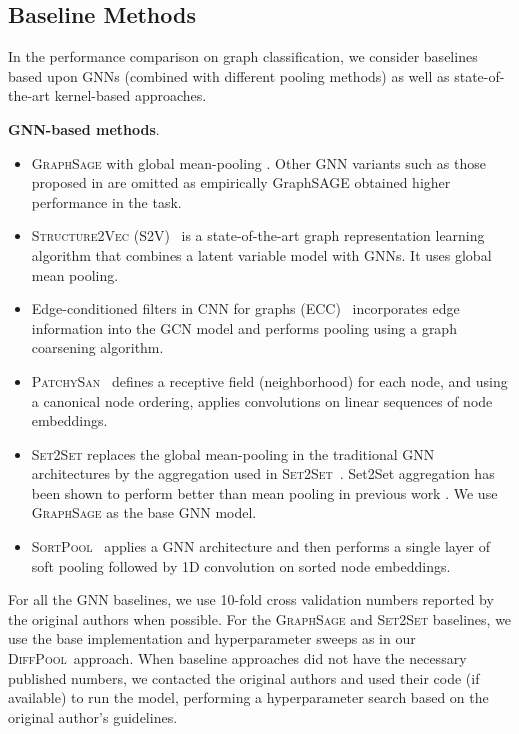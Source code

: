 \documentclass{article}
\newcommand{\xhdr}[1]{{\noindent\bfseries #1}.}
\newcommand{\name}{\textsc{DiffPool}\xspace}
\begin{document}
\subsection{Baseline Methods}
In the performance comparison on graph classification, we consider baselines based upon GNNs (combined with different pooling methods) as well as state-of-the-art kernel-based approaches. 

\xhdr{GNN-based methods} 
\begin{itemize}[leftmargin=15pt, topsep=-5pt, parsep=0pt]
    \item \textsc{GraphSage} with global mean-pooling \cite{hamilton2017inductive}. Other GNN variants such as those proposed in \cite{kipf2017semi} are omitted as empirically GraphSAGE obtained higher performance in the task.
    \item \textsc{Structure2Vec} (\textsc{S2V})~\cite{dai2016discriminative} is a state-of-the-art graph representation learning algorithm that combines a latent variable model with GNNs. It uses global mean pooling.
    \item Edge-conditioned filters in CNN for graphs (\textsc{ECC})~\cite{simonovsky2017dynamic} incorporates edge information into the GCN model and performs pooling using a graph coarsening algorithm. \item \textsc{PatchySan}~\cite{niepert2016learning} defines a receptive field (neighborhood) for each node, and using a canonical node ordering, applies convolutions on linear sequences of node embeddings. 
    \item \textsc{Set2Set} replaces the global mean-pooling in the traditional GNN architectures by the aggregation used in \textsc{Set2Set}~\cite{vinyals2015order}. Set2Set aggregation has been shown to perform better than mean pooling in previous work \cite{Gil+2017}. We use \textsc{GraphSage} as the base GNN model. 
    \item  \textsc{SortPool}~\cite{zhang2018end} applies a GNN architecture and then performs a single layer of soft pooling followed by 1D convolution on sorted node embeddings. 
\end{itemize}

\medskip
For all the GNN baselines, we use 10-fold cross validation numbers reported by the original authors when possible. 
For the \textsc{GraphSage} and \textsc{Set2Set} baselines, we use the base implementation and hyperparameter sweeps as in our \name\ approach.
When baseline approaches did not have the necessary published numbers, we contacted the original authors and used \textbf{}their code (if available) to run the model, performing a hyperparameter search based on the original author's guidelines. 
\end{document}
